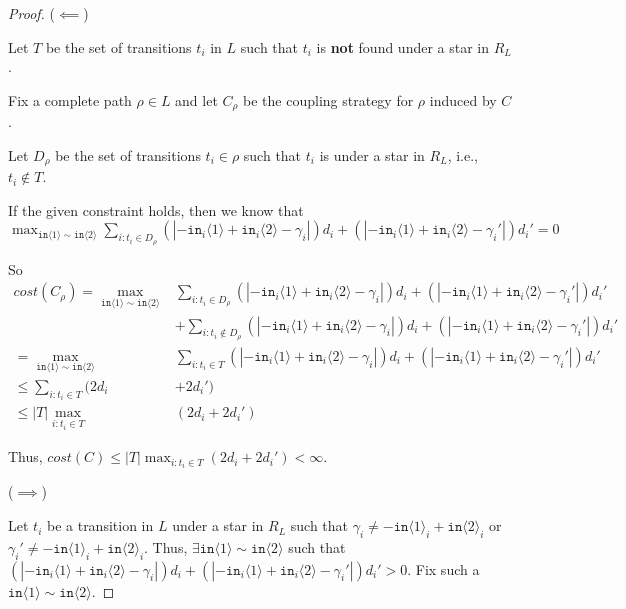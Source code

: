 \documentclass[12pt]{article}
\newcommand{\brangle}[1]{\langle #1 \rangle}
\theoremstyle{definition}
\begin{document}
\begin{proof}

    ($\impliedby$)

    Let $T$ be the set of transitions $t_i$ in $L$ such that $t_i$ is \textbf{not} found under a star in $R_L$. 

    Fix a complete path $\rho\in L$ and let $C_\rho$ be the coupling strategy for $\rho$ induced by $C$. 

    Let $D_\rho$ be the set of transitions $t_i\in \rho$ such that $t_i$ is under a star in $R_L$, i.e., $t_i\notin T$.  

    If the given constraint holds, then we know that $\max_{\texttt{in}\brangle{1}\sim\texttt{in}\brangle{2}}\sum_{i: t_i\in D_\rho}(|-\texttt{in}_i\brangle{1}+\texttt{in}_i\brangle{2}-\gamma_i|)d_i+(|-\texttt{in}_i\brangle{1}+\texttt{in}_i\brangle{2}-\gamma_i'|)d_i' = 0$

    So \begin{align*}
        cost(C_\rho) = \max_{\texttt{in}\brangle{1}\sim\texttt{in}\brangle{2}}&\sum_{i: t_i\in D_\rho}(|-\texttt{in}_i\brangle{1}+\texttt{in}_i\brangle{2}-\gamma_i|)d_i+(|-\texttt{in}_i\brangle{1}+\texttt{in}_i\brangle{2}-\gamma_i'|)d_i'\\
        &+\sum_{i: t_i\notin D_\rho}(|-\texttt{in}_i\brangle{1}+\texttt{in}_i\brangle{2}-\gamma_i|)d_i+(|-\texttt{in}_i\brangle{1}+\texttt{in}_i\brangle{2}-\gamma_i'|)d_i'\\
        = \max_{\texttt{in}\brangle{1}\sim\texttt{in}\brangle{2}}&\sum_{i: t_i\in T}(|-\texttt{in}_i\brangle{1}+\texttt{in}_i\brangle{2}-\gamma_i|)d_i+(|-\texttt{in}_i\brangle{1}+\texttt{in}_i\brangle{2}-\gamma_i'|)d_i'\\
        \leq \sum_{i:t_i\in T}(2d_i& + 2d_i')\\
        \leq |T|\max_{i:t_i\in T}&(2d_i + 2d_i')
    \end{align*}

    Thus, $cost(C)\leq |T|\max_{i:t_i\in T}(2d_i + 2d_i') <\infty$.

    ($\implies$)

    Let $t_i$ be a transition in $L$ under a star in $R_L$ such that $\gamma_i\neq -\texttt{in}\brangle{1}_i+\texttt{in}\brangle{2}_i$ or $\gamma_i'\neq  -\texttt{in}\brangle{1}_i+\texttt{in}\brangle{2}_i$.     Thus, $\exists \texttt{in}\brangle{1}\sim \texttt{in}\brangle{2}$ such that $(|-\texttt{in}_i\brangle{1}+\texttt{in}_i\brangle{2}-\gamma_i|)d_i+(|-\texttt{in}_i\brangle{1}+\texttt{in}_i\brangle{2}-\gamma_i'|)d_i'>0$.
    Fix such a $\texttt{in}\brangle{1}\sim \texttt{in}\brangle{2}$. 


\end{proof}
\end{document}
